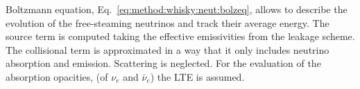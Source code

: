Boltzmann equation, Eq.~\eqref{eq:method:whisky:neut:bolzeq}, allows to describe
the evolution of the free-steaming neutrinos and track their average energy.
%
The source term is computed taking the effective emissivities from the leakage scheme.
The collisional term is approximated in a way that it only includes neutrino absorption and emission. 
Scattering is neglected.
For the evaluation of the absorption opacities, (of $\nu_{e}$ and $\bar{\nu}_{e}$) the 
\ac{LTE} is assumed.


